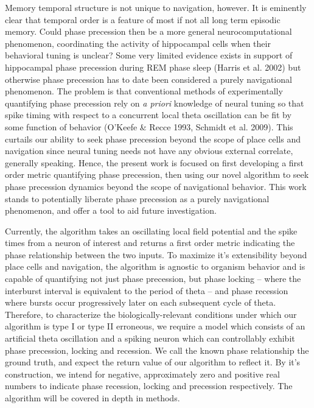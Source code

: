 \documentclass[12pt, letterpaper]{article}
\newenvironment{collapsable}{}{}
\begin{document}
\begin{collapsable}
  Memory temporal structure is not unique to navigation, however. It is eminently
  clear that temporal order is a feature of most if not all long term episodic
  memory. Could phase precession then be a more general neurocomputational
  phenomenon, coordinating the activity of hippocampal cells when their behavioral
  tuning is unclear? Some very limited evidence exists in support of hippocampal phase
  precession during REM phase sleep (Harris et al. 2002) but otherwise phase precession has to date
  been considered a purely navigational phenomenon. The problem is that
  conventional methods of experimentally quantifying phase precession rely on {\it
  a priori} knowledge of neural tuning so that spike timing with respect to a
  concurrent local theta oscillation can be fit by some function of behavior
  (O'Keefe \& Recce 1993, Schmidt et al. 2009).
  This curtails our ability to seek phase precession beyond the scope of place
  cells and navigation since neural tuning needs not have any obvious external
  correlate, generally speaking. Hence, the present work is focused on first developing
  a first order metric quantifying phase precession, then using our novel
  algorithm to seek phase precession dynamics beyond the scope of navigational
  behavior. This work stands to potentially liberate phase precession as a purely
  navigational phenomenon, and offer a tool to aid future investigation.

  \vspace{12pt}

  Currently, the algorithm takes an oscillating local field potential and the spike times
  from a neuron of interest and returns a first order metric indicating the phase
  relationship between the two inputs. To maximize it's extensibility beyond place
  cells and navigation, the algorithm is agnostic to organism behavior and is capable of
  quantifying not just phase precession, but phase locking -- where the interburst
  interval is equivalent to the period of theta -- and phase recession where bursts
  occur progressively later on each subsequent cycle of theta. Therefore, to characterize the
  biologically-relevant conditions under which our algorithm is type I or type II
  erroneous, we require a model which consists of an artificial theta oscillation
  and a spiking neuron which can controllably exhibit phase precession, locking and
  recession. We call the known phase relationship the ground truth, and expect the
  return value of our algorithm to reflect it. By it's construction, we intend
  for negative, approximately zero and positive real numbers to indicate
  phase recession, locking and precession respectively. The algorithm will be
  covered in depth in methods.


\end{collapsable}
\end{document}
